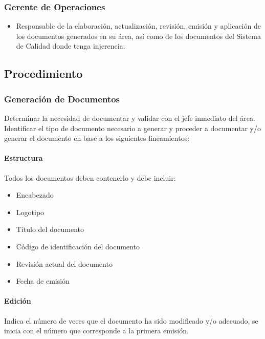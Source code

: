 \subsubsection{Gerente de Operaciones}

\begin{itemize}
	\item Responsable de la elaboración, actualización, revisión, emisión y aplicación de los documentos generados en su área, así como de los documentos del Sistema de Calidad donde tenga injerencia.
\end{itemize}

\subsection{Procedimiento}

\subsubsection{Generación de Documentos}

Determinar la necesidad de documentar y validar con el jefe inmediato del área. Identificar el tipo de documento necesario a generar y proceder a documentar y/o generar el documento en base a los siguientes lineamientos:

\paragraph{Estructura}

Todos los documentos deben contenerlo y debe incluir:

\begin{itemize}
	\item Encabezado
	\item Logotipo
	\item Título del documento
	\item Código de identificación del documento
	\item Revisión actual del documento
	\item Fecha de emisión
\end{itemize}

\paragraph{Edición}

Indica el número de veces que el documento ha sido modificado y/o adecuado, se inicia con el número que corresponde a la primera emisión.

